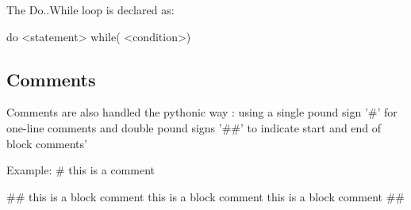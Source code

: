The Do..While loop is declared as:

do
{
    <statement>
}
while( <condition>)



\subsection{Comments}
Comments are also handled the pythonic way : using a single pound sign '#' for one-line comments and double pound signs '##' to indicate start and end of block comments'

Example:
# this is a comment

##
	this is a block comment
	this is a block comment
	this is a block comment
##


\label{sect:core}
